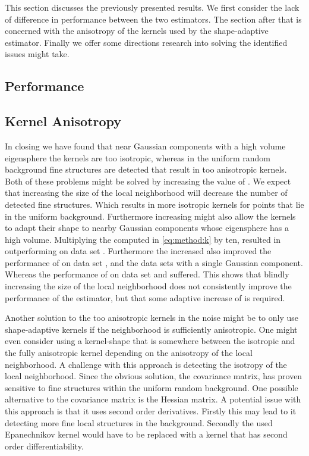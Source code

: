 This section discusses the previously presented results. We first consider the lack of difference in performance between the two estimators. The section after that is concerned with the anisotropy of the kernels used by the shape-adaptive estimator. Finally we offer some directions research into solving the identified issues might take.

\subsection{Performance}
\label{s:discussion:performance}


\subsection{Kernel Anisotropy}
\label{s:discussion:anisotropy}


In closing we have found that near Gaussian components with a high volume eigensphere the kernels are too isotropic, whereas in the uniform random background fine structures are detected that result in too anisotropic kernels. Both of these problems might be solved by increasing the value of \KNNK. 
We expect that increasing the size of the local neighborhood will decrease the number of detected fine structures. Which results in more isotropic kernels for points that lie in the uniform background.
Furthermore increasing \KNNK might also allow the kernels to adapt their shape to nearby Gaussian components whose eigensphere has a high volume. Multiplying the \KNNK computed in \cref{eq:method:k} by ten, resulted in \sambe outperforming \mbe on data set \baakmanFive. Furthermore the increased \KNNK also improved the performance of \sambe on data set \ferdosiThree, \baakmanThree and the data sets with a single Gaussian component. Whereas the performance of \sambe on data set \ferdosiTwo and \baakmanTwo suffered. This shows that blindly increasing the size of the local neighborhood does not consistently improve the performance of the estimator, but that some adaptive increase of \KNNK is required.

Another solution to the too anisotropic kernels in the noise might be to only use shape-adaptive kernels if the neighborhood is sufficiently anisotropic. One might even consider using a kernel-shape that is somewhere between the isotropic and the fully anisotropic kernel depending on the anisotropy of the local neighborhood. A challenge with this approach is detecting the isotropy of the local neighborhood. Since the obvious solution, the covariance matrix, has proven sensitive to fine structures within the uniform random background.
One possible alternative to the covariance matrix is the Hessian matrix. A potential issue with this approach is that it uses second order derivatives. Firstly this may lead to it detecting more fine local structures in the background. Secondly the used Epanechnikov kernel would have to be replaced with a kernel that has second order differentiability.

